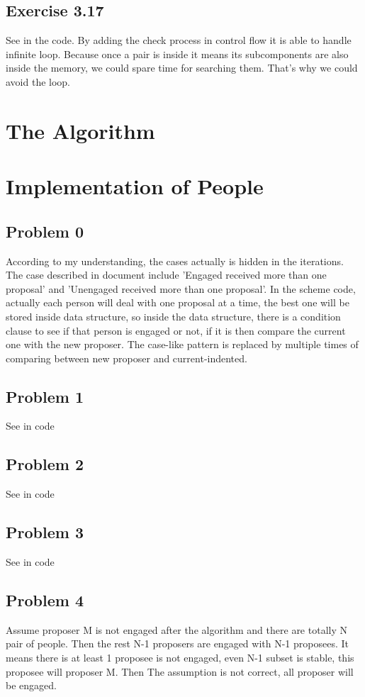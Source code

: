 \documentclass{article}
\begin{document}
\subsection{Exercise 3.17}
See in the code. By adding the  check process in control flow it is able to handle infinite loop. Because once a pair is inside it means its subcomponents are also inside the memory, we could spare time for searching them. That's why we could avoid the loop.
\section{The Algorithm}
\section{Implementation of People}
\subsection{Problem 0}
\indent \par According to my understanding, the cases actually is hidden in the iterations. The case described in document include 'Engaged received more than one proposal' and 'Unengaged received more than one proposal'. In the scheme code, actually each person will deal with one proposal at a time, the best one will be stored inside data structure, so inside the data structure, there is a condition clause to see if that person is engaged or not, if it is then compare the current one with the new proposer. The case-like pattern is replaced by multiple times of comparing between new proposer and current-indented.
\subsection{Problem 1}
See in code
\subsection{Problem 2}
See in code
\subsection{Problem 3}
See in code
\subsection{Problem 4}
Assume proposer M is not engaged after the algorithm and there are totally N pair of people. Then the rest N-1 proposers are engaged with N-1 proposees. It means there is at least 1 proposee is not engaged, even N-1 subset is stable, this proposee will proposer M. Then The assumption is not correct, all proposer will be engaged.
\end{document}
